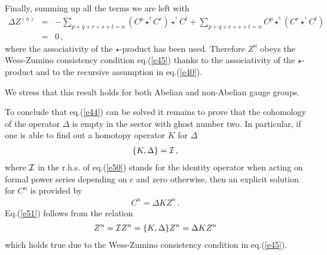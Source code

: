 \documentclass[a4paper,12pt]{article}
\newcommand{\stargr}[1]{\star^{\!\!\!^#1}}
\begin{document}
%
Finally, summing up all the terms we are left with
%
\begin{eqnarray}
\Delta Z^{(n)} & = & 
- \sum_{p+q+r+s+t=n} \left ( C^p \stargr{q} C^r \right ) \stargr{s} C^t
+ \sum_{p+q+r+s+t=n} C^p \stargr{q} \left ( C^r \stargr{s} C^t \right ) 
\nonumber \\
& = & 0 \,,
\label{e49}
\end{eqnarray}
%
where the associativity of the $\star$-product has been used.
Therefore $Z^n$ obeys the Wess-Zumino consistency condition eq.(\ref{e45})
 thanks to the associativity of the $\star$-product and to
 the recursive assumption in eq.(\ref{e40}).

We stress that this result holds for both Abelian and non-Abelian
 gauge groups. 

To conclude that eq.(\ref{e44}) can be solved it remains to
 prove that the cohomology of the operator
 $\Delta$ is empty in the sector with ghost number two.
In particular, if one is able to find out a homotopy operator $K$ for
 $\Delta$
%
\begin{eqnarray}
\{ K , \Delta \} = {\cal I} \, ,
\label{e50}
\end{eqnarray}
%
where ${\cal I}$ in the r.h.s. of eq.(\ref{e50}) stands for the identity 
 operator when acting on formal power series depending on $c$
 and zero otherwise,
 then an explicit solution for $C^n$ is provided by
%
\begin{eqnarray}
C^n =  \Delta K Z^n \, .
\label{e51}
\end{eqnarray}
%
Eq.(\ref{e51}) follows from the relation
%
\begin{eqnarray}
Z^n = {\cal I} Z^n = \{ K, \Delta \} Z^n = \Delta K Z^n 
\label{e51.bis}
\end{eqnarray}
which holds true due to the Wess-Zumino
 consistency condition in eq.(\ref{e45}).
\end{document}

